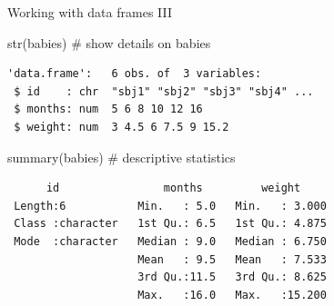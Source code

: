 \documentclass[
  ignorenonframetext,
]{beamer}
\newenvironment{Shaded}{\begin{snugshade}}{\end{snugshade}}
\newcommand{\CommentTok}[1]{\textcolor[rgb]{0.54,0.53,0.53}{#1}}
\newcommand{\FunctionTok}[1]{\textcolor[rgb]{0.39,0.29,0.61}{#1}}
\newcommand{\NormalTok}[1]{\textcolor[rgb]{0.12,0.11,0.11}{#1}}
\begin{document}
\begin{frame}[fragile]{Working with data frames III}
\protect\hypertarget{working-with-data-frames-iii}{}
\begin{Shaded}
\begin{Highlighting}[]
\FunctionTok{str}\NormalTok{(babies) }\CommentTok{\# show details on babies}
\end{Highlighting}
\end{Shaded}

\begin{verbatim}
'data.frame':   6 obs. of  3 variables:
 $ id    : chr  "sbj1" "sbj2" "sbj3" "sbj4" ...
 $ months: num  5 6 8 10 12 16
 $ weight: num  3 4.5 6 7.5 9 15.2
\end{verbatim}

\begin{Shaded}
\begin{Highlighting}[]
\FunctionTok{summary}\NormalTok{(babies) }\CommentTok{\# descriptive statistics }
\end{Highlighting}
\end{Shaded}

\begin{verbatim}
      id                months         weight      
 Length:6           Min.   : 5.0   Min.   : 3.000  
 Class :character   1st Qu.: 6.5   1st Qu.: 4.875  
 Mode  :character   Median : 9.0   Median : 6.750  
                    Mean   : 9.5   Mean   : 7.533  
                    3rd Qu.:11.5   3rd Qu.: 8.625  
                    Max.   :16.0   Max.   :15.200  
\end{verbatim}
\end{frame}
\end{document}
